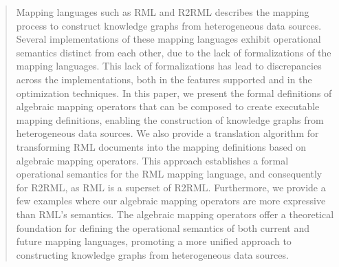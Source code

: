 \begin{abstract}
Mapping languages such as RML and R2RML describes the mapping process to
construct knowledge graphs from heterogeneous data sources. 
Several implementations of these mapping languages exhibit 
operational semantics distinct from each other, due to the lack of formalizations of 
the mapping languages. 
This lack of formalizations has lead to discrepancies across the
implementations, both in the features supported and in the optimization
techniques.
In this paper, we present the formal definitions of algebraic mapping operators that can
be composed to create executable mapping definitions, enabling the
construction of knowledge graphs from heterogeneous data sources. 
We also provide a translation algorithm for transforming RML documents into the 
mapping definitions based on algebraic mapping operators. 
This approach establishes a formal operational semantics for the RML mapping language, 
and consequently for R2RML, as RML is a superset of R2RML.
Furthermore, we provide a few examples where our algebraic mapping operators 
are more expressive than RML's semantics. %
The algebraic mapping operators offer a theoretical foundation for defining the
operational semantics of both current and future mapping languages,
promoting a more unified approach to constructing knowledge graphs from
heterogeneous data sources.
\end{abstract}

